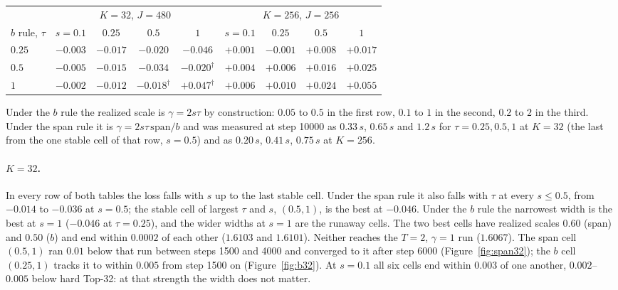 \documentclass[11pt,a4paper]{article}
\begin{document}
\begin{center}\small
\begin{tabular}{l|cccc|cccc}
\toprule
& \multicolumn{4}{c|}{$K = 32$, $J = 480$}
& \multicolumn{4}{c}{$K = 256$, $J = 256$} \\
$b$ rule, $\tau$ & $s{=}0.1$ & $0.25$ & $0.5$ & $1$ & $s{=}0.1$ & $0.25$ & $0.5$ & $1$ \\
\midrule
$0.25$ & $-0.003$ & $-0.017$ & $-0.020$ & $\mathbf{-0.046}$ & $+0.001$ & $\mathbf{-0.001}$ & $+0.008$ & $+0.017$ \\
$0.5$  & $-0.005$ & $-0.015$ & $-0.034$ & $-0.020^\dagger$ & $+0.004$ & $+0.006$ & $+0.016$ & $+0.025$ \\
$1$    & $-0.002$ & $-0.012$ & $-0.018^\dagger$ & $+0.047^\dagger$ & $+0.006$ & $+0.010$ & $+0.024$ & $+0.055$ \\
\bottomrule
\end{tabular}
\end{center}

Under the $b$ rule the realized scale is $\gamma = 2 s \tau$ by construction:
$0.05$ to $0.5$ in the first row, $0.1$ to $1$ in the second, $0.2$ to $2$ in
the third. Under the span rule it is $\gamma = 2 s \tau\,\mathrm{span}/b$ and
was measured at step 10000 as $0.33\,s$, $0.65\,s$ and $1.2\,s$ for $\tau =
0.25, 0.5, 1$ at $K = 32$ (the last from the one stable cell of that row,
$s = 0.5$) and as $0.20\,s$, $0.41\,s$, $0.75\,s$ at $K = 256$.

\paragraph{$K = 32$.}
In every row of both tables the loss falls with $s$ up to the last stable
cell. Under the span rule it also falls with $\tau$ at every $s \le 0.5$,
from $-0.014$ to $-0.036$ at $s = 0.5$; the stable cell of largest $\tau$ and
$s$, $(0.5, 1)$, is the best at $-0.046$. Under the $b$ rule the narrowest
width is the best at $s = 1$ ($-0.046$ at $\tau = 0.25$), and the wider
widths at $s = 1$ are the runaway cells. The two best cells have realized
scales $0.60$ (span) and $0.50$ ($b$) and end within $0.0002$ of each other
($1.6103$ and $1.6101$). Neither reaches the $T = 2$, $\gamma = 1$ run
($1.6067$). The span cell $(0.5, 1)$ ran $0.01$ below that run between
steps 1500 and 4000 and converged to it after step 6000
(Figure~\ref{fig:span32}); the $b$ cell $(0.25, 1)$ tracks it to within
$0.005$ from step 1500 on (Figure~\ref{fig:b32}). At $s = 0.1$ all six
cells end within $0.003$ of one another, $0.002$--$0.005$ below hard Top-32:
at that strength the width does not matter.
\end{document}
